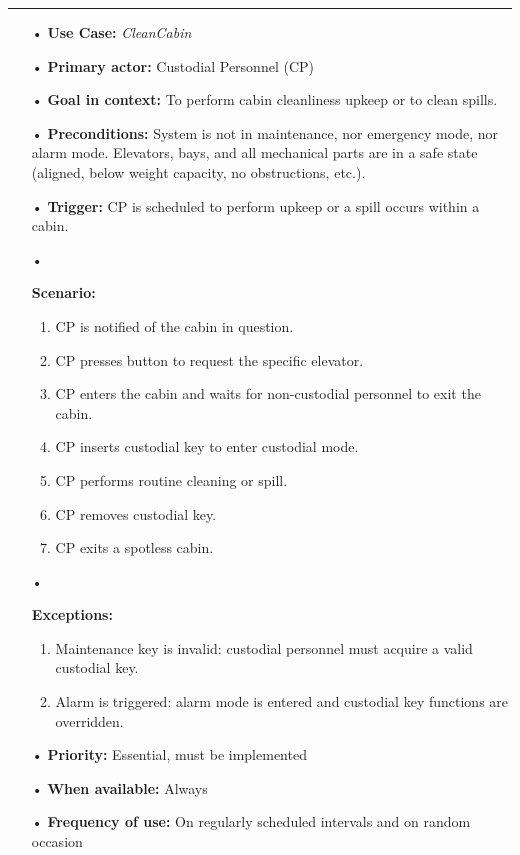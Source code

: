 \documentclass[12pt]{article}
\begin{document}
		\par\noindent\rule{\textwidth}{0.4pt}
		\begin{itemize} %
			\item[•] \textbf{Use Case:} \textit{CleanCabin}
			\item[•] \textbf{Primary actor:} Custodial Personnel (CP)
			\item[•] \textbf{Goal in context:} To perform cabin cleanliness upkeep or to clean spills.
			\item[•] \textbf{Preconditions:} System is not in maintenance, nor emergency mode, nor alarm mode. 
			Elevators, bays, and all mechanical parts are in a safe state (aligned, below weight capacity, 
			no obstructions, etc.).
			\item[•] \textbf{Trigger:} CP is scheduled to perform upkeep or a spill occurs within a cabin.
			\item[•]{\textbf{Scenario:}
		        \begin{enumerate}
		        	\item CP is notified of the cabin in question.
		        	\item CP presses button to request the specific elevator.
		        	\item CP enters the cabin and waits for non-custodial personnel to exit the cabin.
		        	\item CP inserts custodial key to enter custodial mode.
		        	\item CP performs routine cleaning or spill.
		        	\item CP removes custodial key.
		        	\item CP exits a spotless cabin.
		        \end{enumerate}}
			\item[•]{\textbf{Exceptions:} 
			    \begin{enumerate}
		        	\item Maintenance key is invalid: custodial personnel must acquire a valid custodial key.
			    	\item Alarm is triggered: alarm mode is entered and custodial key functions are overridden.
		        \end{enumerate}}
			\item[•] \textbf{Priority:} Essential, must be implemented
			\item[•] \textbf{When available:} Always
			\item[•] \textbf{Frequency of use:} On regularly scheduled intervals and on random occasion

\end{itemize}
\end{document}
